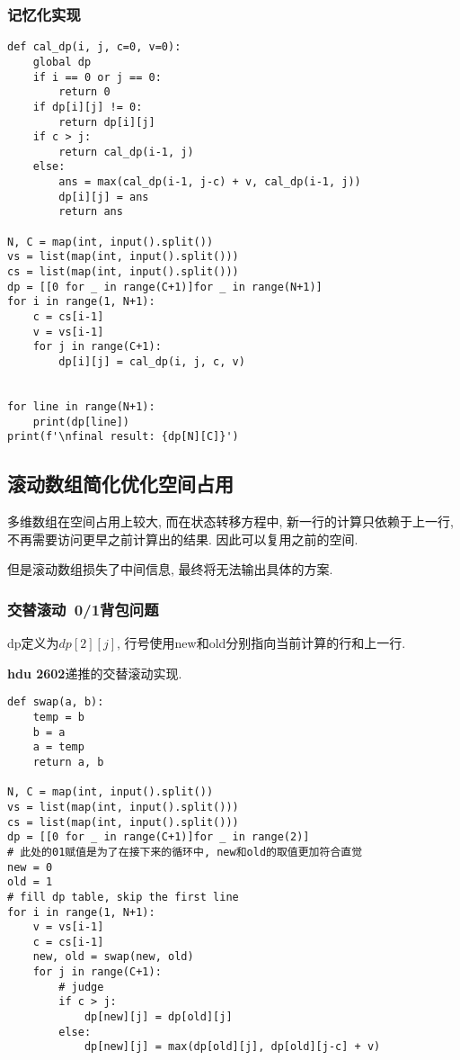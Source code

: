 \documentclass[../main]{subfiles}
\begin{document}
\begin{sloppy}
\subsubsection{记忆化实现}

\begin{lstlisting}[style = Python]
def cal_dp(i, j, c=0, v=0):
    global dp
    if i == 0 or j == 0:
        return 0
    if dp[i][j] != 0:
        return dp[i][j]
    if c > j:
        return cal_dp(i-1, j)
    else:
        ans = max(cal_dp(i-1, j-c) + v, cal_dp(i-1, j))
        dp[i][j] = ans
        return ans

N, C = map(int, input().split())
vs = list(map(int, input().split()))
cs = list(map(int, input().split())) 
dp = [[0 for _ in range(C+1)]for _ in range(N+1)]
for i in range(1, N+1):
    c = cs[i-1]
    v = vs[i-1]
    for j in range(C+1):
        dp[i][j] = cal_dp(i, j, c, v)


for line in range(N+1):
    print(dp[line])
print(f'\nfinal result: {dp[N][C]}')
\end{lstlisting}

\subsection{滚动数组简化优化空间占用}

多维数组在空间占用上较大, 而在状态转移方程中, 新一行的计算只依赖于上一行, 不再需要访问更早之前计算出的结果. 因此可以复用之前的空间.

但是滚动数组损失了中间信息, 最终将无法输出具体的方案.

\subsubsection{交替滚动\ 0/1背包问题}

dp定义为$dp[2][j]$, 行号使用new和old分别指向当前计算的行和上一行.

\textbf{hdu 2602}递推的交替滚动实现.

\begin{lstlisting}[style = Python]
def swap(a, b):
    temp = b
    b = a
    a = temp
    return a, b

N, C = map(int, input().split())
vs = list(map(int, input().split()))
cs = list(map(int, input().split())) 
dp = [[0 for _ in range(C+1)]for _ in range(2)]
# 此处的01赋值是为了在接下来的循环中, new和old的取值更加符合直觉
new = 0
old = 1
# fill dp table, skip the first line
for i in range(1, N+1):
    v = vs[i-1]
    c = cs[i-1]
    new, old = swap(new, old)
    for j in range(C+1):
        # judge 
        if c > j:
            dp[new][j] = dp[old][j]
        else:
            dp[new][j] = max(dp[old][j], dp[old][j-c] + v)


\end{lstlisting}
\end{sloppy}
\end{document}
